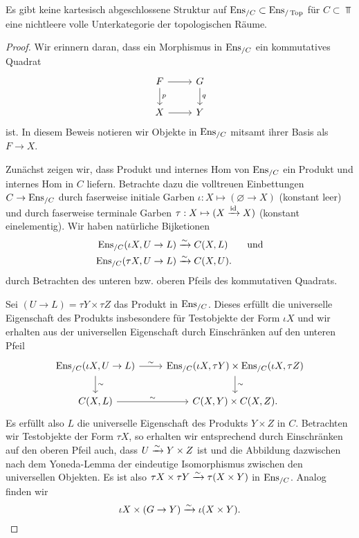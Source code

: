 \begin{satz}
  Es gibt keine kartesisch abgeschlossene Struktur auf
  $\operatorname{Ens}_{/C} \subset \operatorname{Ens}_{/\operatorname{Top}}$ für $C \subset \Top$ eine
  nichtleere volle Unterkategorie der topologischen Räume.
\end{satz}
\begin{proof}
  Wir erinnern daran, dass ein Morphismus in $\operatorname{Ens}_{/C}$ ein
  kommutatives Quadrat
  \[ \begin{tikzcd}
    F \arrow[r] \dar{p} & G \dar{q} \\
    X \arrow[r] & Y
  \end{tikzcd} \]
  ist. In diesem Beweis notieren wir Objekte in $\operatorname{Ens}_{/C}$ mitsamt
  ihrer Basis als $F \to X$.
  
  Zunächst zeigen wir, dass Produkt und internes Hom von $\operatorname{Ens}_{/C}$
  ein Produkt und internes Hom in $C$ liefern. Betrachte dazu die
  volltreuen Einbettungen $C \to \operatorname{Ens}_{/C}$ durch faserweise initiale
  Garben $\iota: X \mapsto (\varnothing \to X)$ (konstant leer) und
  durch faserweise terminale Garben $\tau: X \mapsto (X
  \xrightarrow{\operatorname{id}} X)$ (konstant einelementig). Wir haben natürliche
  Bijketionen
  \begin{align*}
    \operatorname{Ens}_{/C}(\iota X, U \to L) &\xrightarrow[]{\sim} C(X, L) \qquad \text{und} \\
    \operatorname{Ens}_{/C}(\tau X, U \to L) &\xrightarrow[]{\sim} C(X, U).
  \end{align*}
  durch Betrachten des unteren bzw. oberen Pfeils des kommutativen
  Quadrats.

  Sei $(U \to L) = \tau Y \times \tau Z$ das Produkt in
  $\operatorname{Ens}_{/C}$. Dieses erfüllt die universelle Eigenschaft des Produkts
  insbesondere für Testobjekte der Form $\iota X$ und wir erhalten aus
  der universellen Eigenschaft durch Einschränken auf den unteren
  Pfeil
  \[ \begin{tikzcd}
    \Ens_{/C}(\iota X, U \to L) \rar{\sim}
    \arrow{d}{\sim}
    & \Ens_{/C}(\iota X, \tau Y) \times \Ens_{/C}(\iota X, \tau Z)
    \dar{\sim} \\
    C(X, L) \rar{\sim}
    & C(X, Y) \times C(X, Z).
  \end{tikzcd} \]
  Es erfüllt also $L$ die universelle Eigenschaft des Produkts $Y
  \times Z$ in $C$.  Betrachten wir Testobjekte der Form $\tau X$, so
  erhalten wir entsprechend durch Einschränken auf den oberen Pfeil
  auch, dass $U \xrightarrow[]{\sim} Y \times Z$ ist und die Abbildung dazwischen nach
  dem Yoneda-Lemma der eindeutige Isomorphismus zwischen den
  universellen Objekten. Es ist also $\tau X \times \tau Y \xrightarrow[]{\sim} \tau
  (X \times Y)$ in $\operatorname{Ens}_{/C}$. Analog finden wir
  \begin{equation} \label{eq:iota-prod}
    \iota X \times (G \to Y) \xrightarrow[]{\sim} \iota (X \times Y).
  \end{equation}
  

\end{proof}
